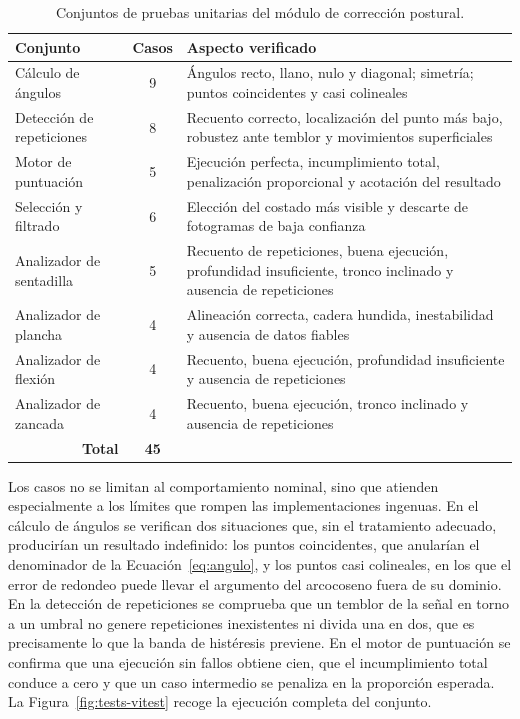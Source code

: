 \documentclass[12pt,a4paper,twoside,openright]{book}
\begin{document}
    \begin{table}[htbp]
        \centering
        \small
        \begin{tabular}{p{4.3cm} c p{6.2cm}}
            \toprule
            \textbf{Conjunto} & \textbf{Casos} & \textbf{Aspecto verificado} \\
            \midrule
            Cálculo de ángulos      & 9 & Ángulos recto, llano, nulo y diagonal; simetría; puntos coincidentes y casi colineales \\
            Detección de repeticiones & 8 & Recuento correcto, localización del punto más bajo, robustez ante temblor y movimientos superficiales \\
            Motor de puntuación     & 5 & Ejecución perfecta, incumplimiento total, penalización proporcional y acotación del resultado \\
            Selección y filtrado    & 6 & Elección del costado más visible y descarte de fotogramas de baja confianza \\
            Analizador de sentadilla & 5 & Recuento de repeticiones, buena ejecución, profundidad insuficiente, tronco inclinado y ausencia de repeticiones \\
            Analizador de plancha   & 4 & Alineación correcta, cadera hundida, inestabilidad y ausencia de datos fiables \\
            Analizador de flexión   & 4 & Recuento, buena ejecución, profundidad insuficiente y ausencia de repeticiones \\
            Analizador de zancada   & 4 & Recuento, buena ejecución, tronco inclinado y ausencia de repeticiones \\
            \midrule
            \multicolumn{1}{r}{\textbf{Total}} & \textbf{45} & \\
            \bottomrule
        \end{tabular}
        \caption{Conjuntos de pruebas unitarias del módulo de corrección
        postural.}
        \label{tab:pruebas-postural-unit}
    \end{table}

    Los casos no se limitan al comportamiento nominal, sino que atienden
    especialmente a los límites que rompen las implementaciones ingenuas. En el
    cálculo de ángulos se verifican dos situaciones que, sin el tratamiento
    adecuado, producirían un resultado indefinido: los puntos coincidentes, que
    anularían el denominador de la Ecuación~\ref{eq:angulo}, y los puntos casi
    colineales, en los que el error de redondeo puede llevar el argumento del
    arcocoseno fuera de su dominio. En la detección de repeticiones se comprueba
    que un temblor de la señal en torno a un umbral no genere repeticiones
    inexistentes ni divida una en dos, que es precisamente lo que la banda de
    histéresis previene. En el motor de puntuación se confirma que una ejecución
    sin fallos obtiene cien, que el incumplimiento total conduce a cero y que un
    caso intermedio se penaliza en la proporción esperada. La
    Figura~\ref{fig:tests-vitest} recoge la ejecución completa del conjunto.
\end{document}
